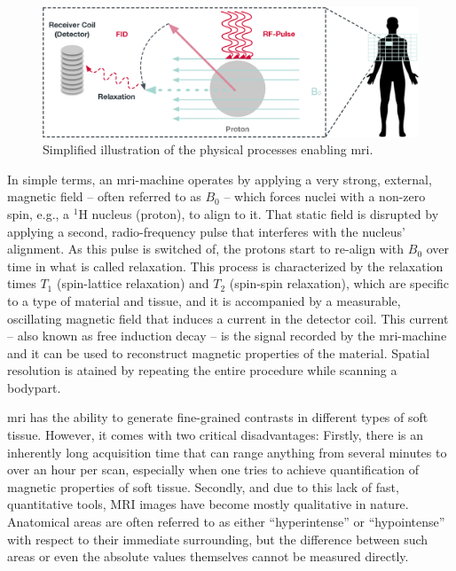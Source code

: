 \begin{figure}[b]
    \centering
    \includegraphics[width=\textwidth]{figures/mri.eps}
    \caption{Simplified illustration of the physical processes enabling \acrshort{mri}.}
    \label{figure:mri}
\end{figure}

In simple terms, an \acrshort{mri}-machine operates by applying a very strong, external, magnetic field -- often referred to as $B_0$ -- which forces nuclei with a non-zero spin, e.g., a $^{1}\text{H}$ nucleus (proton), to align to it. That static field is disrupted by applying a second, radio-frequency pulse that interferes with the nucleus' alignment. As this pulse is switched of, the protons start to re-align with $B_0$ over time in what is called relaxation. This process is characterized by the relaxation times $T_1$ (spin-lattice relaxation) and $T_2$ (spin-spin relaxation), which are specific to a type of material and tissue, and it is accompanied by a measurable, oscillating magnetic field that induces a current in the detector coil. This current -- also known as free induction decay -- is the signal recorded by the \acrshort{mri}-machine and it can be used to reconstruct magnetic properties of the material. Spatial resolution is atained by repeating the entire procedure while scanning a bodypart.

\acrshort{mri} has the ability to generate fine-grained contrasts in different types of soft tissue. However, it comes with two critical disadvantages: Firstly, there is an inherently long acquisition time that can range anything from several minutes to over an hour per scan, especially when one tries to achieve quantification of magnetic properties of soft tissue. Secondly, and due to this lack of fast, quantitative tools, MRI images have become mostly qualitative in nature. Anatomical areas are often referred to as either ``hyperintense'' or ``hypointense'' with respect to their immediate surrounding, but the difference between such areas or even the absolute values themselves cannot be measured directly.


